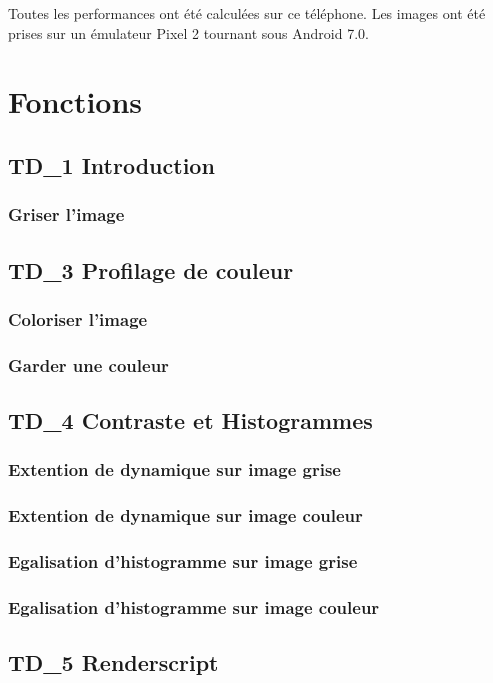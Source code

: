 \documentclass{article}
\begin{document}
Toutes les performances ont été calculées sur ce téléphone. 
Les images ont été prises sur un émulateur Pixel 2 tournant sous Android 7.0.
\newpage

\section{Fonctions}

\subsection{TD_1 Introduction}
\subsubsection{Griser l'image}
\subsection{TD_3 Profilage de couleur}
\subsubsection{Coloriser l'image}
\subsubsection{Garder une couleur}
\subsection{TD_4 Contraste et Histogrammes}
\subsubsection{Extention de dynamique sur image grise}
\subsubsection{Extention de dynamique sur image couleur}
\subsubsection{Egalisation d'histogramme sur image grise}
\subsubsection{Egalisation d'histogramme sur image couleur}
\subsection{TD_5 Renderscript}
\end{document}
